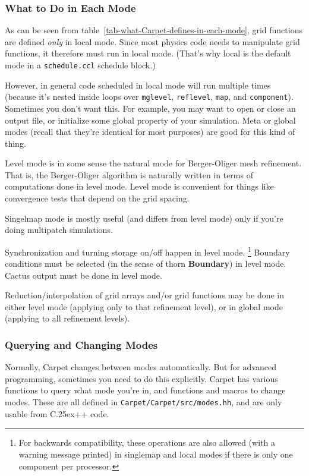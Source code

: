 \documentclass{article}
\def\thorn#1{\textbf{#1}}
\def\Cplusplus{\hbox{C\raise.25ex\hbox{\footnotesize ++}}}
\begin{document}

\subsubsection{What to Do in Each Mode}

As can be seen from table~\ref{tab-what-Carpet-defines-in-each-mode},
grid functions are defined \emph{only} in local mode.  Since most physics
code needs to manipulate grid functions, it therefore must run in local
mode.  (That's why local is the default mode in a \verb|schedule.ccl|
schedule block.)

However, in general code scheduled in local mode will run multiple times
(because it's nested inside loops over \texttt{mglevel}, \texttt{reflevel},
\texttt{map}, and \texttt{component}).  Sometimes you don't want this.
For example, you may want to open or close an output file, or initialize
some global property of your simulation.  Meta or global modes (recall
that they're identical for most purposes) are good for this kind of thing.

Level mode is in some sense the natural mode for Berger-Oliger mesh
refinement.  That is, the Berger-Oliger algorithm is naturally written
in terms of computations done in level mode.  Level mode is convenient
for things like convergence tests that depend on the grid spacing.

Singelmap mode is mostly useful (and differs from level mode) only if
you're doing multipatch simulations.

Synchronization and turning storage on/off happen in level mode.%
\footnote{%
	 For backwards compatibility, these operations are
	 also allowed (with a warning message printed) in
	 singlemap and local modes if there is only one
	 component per processor.
	 }%
{}  Boundary conditions must be selected (in the sense of thorn
\thorn{Boundary}) in level mode.  Cactus output must be done in level mode.

Reduction/interpolation of grid arrays and/or grid functions may be
done in either level mode (applying only to that refinement level),
or in global mode (applying to all refinement levels).  


\subsubsection{Querying and Changing Modes}

Normally, Carpet changes between modes automatically.  But for
advanced programming, sometimes you need to do this explicitly.
Carpet has various functions to query what mode you're in, and
functions and macros to change modes.  These are all defined in
\verb|Carpet/Carpet/src/modes.hh|, and are only usable from
\Cplusplus{} code.
\end{document}
